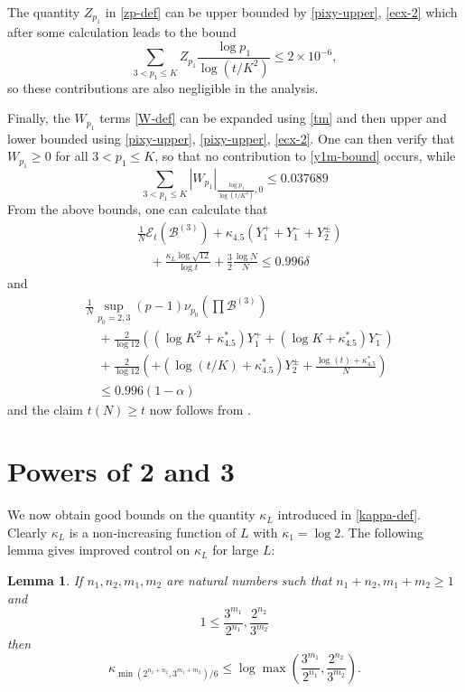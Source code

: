 \documentclass[12pt,a4paper,reqno]{amsart}
\numberwithin{equation}{section}
\theoremstyle{plain}
\newtheorem{lemma}[theorem]{Lemma}
\theoremstyle{definition}
\newcommand\tuple{{\mathcal B}}
\newcommand\excess{{\mathcal{E}}}
\begin{document}
The quantity $Z_{p_1}$ in \eqref{zp-def} can be upper bounded by \eqref{pixy-upper}, \eqref{ecx-2} which after some calculation leads to the bound
$$ \sum_{3 < p_1 \leq K} Z_{p_1} \frac{\log p_1}{\log(t/K^2)} \leq 2 \times 10^{-6},$$
so these contributions are also negligible in the analysis.

Finally, the $W_{p_1}$ terms \eqref{W-def} can be expanded using \eqref{tm} and then upper and lower bounded using \eqref{pixy-upper}, \eqref{pixy-upper}, \eqref{ecx-2}.  One can then verify that $W_{p_1} \geq 0$ for all $3 < p_1 \leq K$, so that no contribution to \eqref{y1m-bound} occurs, while
$$ \sum_{3 < p_1 \leq K} |W_{p_1}|_{\frac{\log p_1}{\log (t/K^2)}, 0} \leq 0.037689$$
From the above bounds, one can calculate that
\begin{align*}
&  \frac{1}{N} \excess_t(\tuple^{(3)}) + \kappa_{4.5}(Y_1^+ + Y_1^- + Y_2^\pm) \\
&\quad + \frac{\kappa_L \log \sqrt{12}}{\log t} + \frac{3}{2} \frac{\log N}{N} \leq 0.996 \delta
\end{align*}
and
\begin{align*}
  &\frac{1}{N} \sup_{p_0=2,3} (p-1) \nu_{p_0}\left(\prod \tuple^{(3)}\right) \\
  &\quad + \frac{2}{\log 12} \left( (\log K^2 +\kappa^*_{4.5}) Y_1^+ + (\log K + \kappa^*_{4.5}) Y_1^- \right) \\
  &\quad + \frac{2}{\log 12} \left(  + (\log(t/K) +\kappa^*_{4.5}) Y_2^\pm + \frac{\log(t) + \kappa^*_{4.5}}{N}  \right)
  \\
    &\quad  \leq 0.996 (1-\alpha) 
\end{align*}
and the claim $t(N) \geq t$ now follows from .

\appendix

\section{Powers of 2 and 3}\label{power-sec}

We now obtain good bounds on the quantity $\kappa_L$ introduced in \eqref{kappa-def}.  Clearly $\kappa_L$ is a non-increasing function of $L$ with $\kappa_1 = \log 2$.  The following lemma gives improved control on $\kappa_L$ for large $L$:

\begin{lemma}\label{lemcount-0}  If $n_1,n_2,m_1,m_2$ are natural numbers such that $n_1+n_2, m_1+m_2 \geq 1$ and
$$ 1 \leq \frac{3^{m_1}}{2^{n_1}}, \frac{2^{n_2}}{3^{m_2}}$$
then
$$ \kappa_{\min( 2^{n_1+n_2},3^{m_1+m_2})/6} \leq \log \max\left(\frac{3^{m_1}}{2^{n_1}}, \frac{2^{n_2}}{3^{m_2}}\right).$$
\end{lemma}
\end{document}
